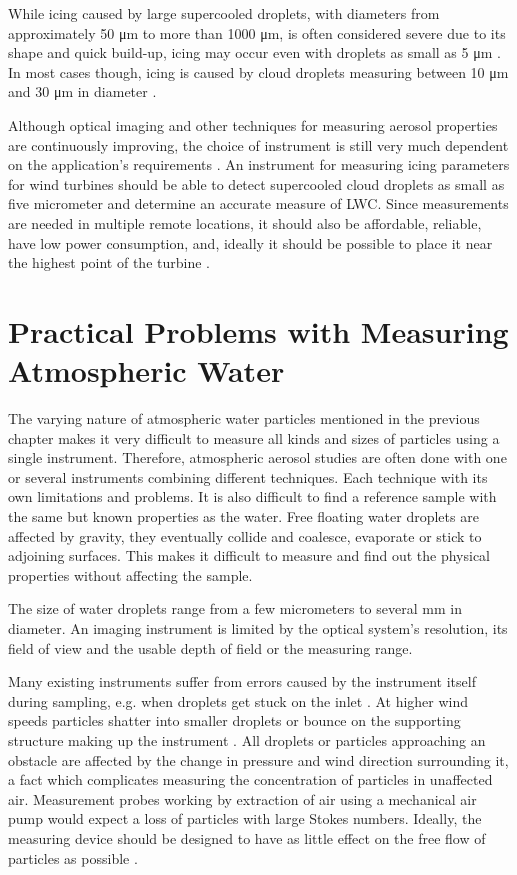While icing caused by large supercooled droplets, with diameters from approximately 50 μm to more than 1000 μm, is often considered severe due to its shape and quick build-up, icing may occur even with droplets as small as 5 μm \cite{sand1984, cob2001, homo2010}. In most cases though, icing is caused by cloud droplets measuring between 10 μm and 30 μm in diameter \cite{makk1992, cob2001}.

Although optical imaging and other techniques for measuring aerosol properties are continuously improving, the choice of instrument is still very much dependent on the application’s requirements \cite{ide1999, baum1983, baum2011, kulk2011}. An instrument for measuring icing parameters for wind turbines should be able to detect supercooled cloud droplets as small as five micrometer and determine an accurate measure of LWC. Since measurements are needed in multiple remote locations, it should also be affordable, reliable, have low power consumption, and, ideally it should be possible to place it near the highest point of the turbine \cite{homo2006}.

\section{Practical Problems with Measuring Atmospheric Water}

The varying nature of atmospheric water particles mentioned in the previous chapter makes it very difficult to measure all kinds and sizes of particles using a single instrument. Therefore, atmospheric aerosol studies are often done with one or several instruments combining different techniques. Each technique with its own limitations and problems. It is also difficult to find a reference sample with the same but known properties as the water. Free floating water droplets are affected by gravity, they eventually collide and coalesce, evaporate or stick to adjoining  surfaces. This makes it difficult to measure and find out the physical properties without affecting the sample.

The size of water droplets range from a few micrometers to several mm in diameter. An imaging instrument is limited by the optical system's resolution, its field of view and the usable depth of field or the measuring range.

Many existing instruments suffer from errors caused by the instrument itself during sampling, e.g. when droplets get stuck on the inlet \cite{spie2012}. At higher wind speeds particles shatter into smaller droplets or bounce on the supporting structure making up the instrument \cite{cohen1991,field2006}. All droplets or particles approaching an obstacle are affected by the change in pressure and wind direction surrounding it, a fact which complicates measuring the concentration of particles in unaffected air. Measurement probes working by extraction of air using a mechanical air pump would expect a loss of particles with large Stokes numbers. Ideally, the measuring device should be designed to have as little effect on the free flow of particles as possible \cite{baum2011}.

